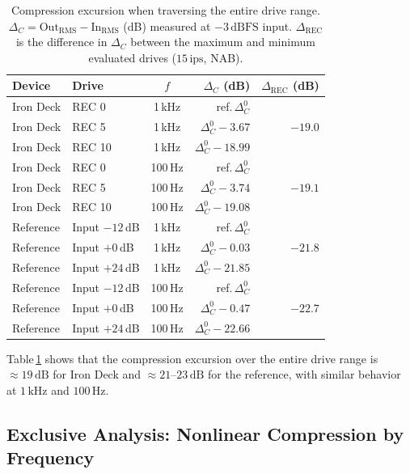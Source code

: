 \documentclass[10pt,conference]{IEEEtran}
\begin{document}
\begin{table}[htbp]
\caption{Compression excursion when traversing the entire drive range.
$\Delta_C = \text{Out}_\text{RMS} - \text{In}_\text{RMS}$ (dB) measured at
$-3\,\text{dBFS}$ input. $\Delta_\text{REC}$ is the difference in $\Delta_C$ between the
maximum and minimum evaluated drives ($15\,\text{ips}$, NAB).}
\label{tab:transferencia}
\centering
\small
\begin{tabular}{llcrr}
\toprule
Device & Drive & $f$ & $\Delta_C$ (dB) & $\Delta_\text{REC}$ (dB) \\
\midrule
Iron Deck & REC 0  & 1\,kHz & ref.\,$\Delta_C^0$      & \multirow{3}{*}{$-19.0$} \\
Iron Deck & REC 5  & 1\,kHz & $\Delta_C^0 - 3.67$  & \\
Iron Deck & REC 10 & 1\,kHz & $\Delta_C^0 - 18.99$ & \\
\midrule
Iron Deck & REC 0  & 100\,Hz & ref.\,$\Delta_C^0$      & \multirow{3}{*}{$-19.1$} \\
Iron Deck & REC 5  & 100\,Hz & $\Delta_C^0 - 3.74$  & \\
Iron Deck & REC 10 & 100\,Hz & $\Delta_C^0 - 19.08$ & \\
\midrule
Reference & Input $-12$\,dB & 1\,kHz  & ref.\,$\Delta_C^0$      & \multirow{3}{*}{$-21.8$} \\
Reference & Input $+0$\,dB  & 1\,kHz  & $\Delta_C^0 - 0.03$  & \\
Reference & Input $+24$\,dB & 1\,kHz  & $\Delta_C^0 - 21.85$ & \\
\midrule
Reference & Input $-12$\,dB & 100\,Hz & ref.\,$\Delta_C^0$      & \multirow{3}{*}{$-22.7$} \\
Reference & Input $+0$\,dB  & 100\,Hz & $\Delta_C^0 - 0.47$  & \\
Reference & Input $+24$\,dB & 100\,Hz & $\Delta_C^0 - 22.66$ & \\
\bottomrule
\end{tabular}
\end{table}

Table\,\ref{tab:transferencia} shows that the compression excursion over the entire drive range
is $\approx 19\,\text{dB}$ for Iron Deck and $\approx 21$--$23\,\text{dB}$ for the reference,
with similar behavior at $1\,\text{kHz}$ and $100\,\text{Hz}$.

\subsection{Exclusive Analysis: Nonlinear Compression by Frequency}
\label{sec:compresion_frec}
\end{document}
